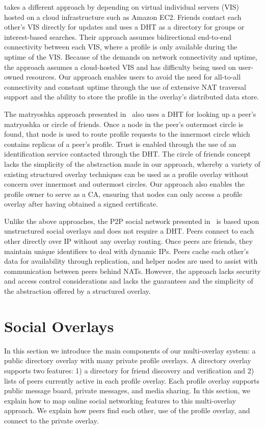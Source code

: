 \documentclass[letterpaper,twocolumn,10pt]{article}
\begin{document}
\cite{vis-a-vis} takes a different approach by depending on virtual individual
servers (VIS) hosted on a cloud infrastructure such as Amazon EC2. Friends
contact each other's VIS directly for updates and uses a DHT as a directory for
groups or interest-based searches. Their approach assumes bidirectional
end-to-end connectivity between each VIS, where a profile is only available
during the uptime of the VIS.  Because of the demands on network connectivity
and uptime, the approach assumes a cloud-hosted VIS and has difficulty being used on user-owned resources.
Our approach enables users to avoid the need for all-to-all connectivity and
constant uptime through the use of extensive NAT traversal support and the
ability to store the profile in the overlay's distributed data store.

The matryoshka approach presented in~\cite{matryoshka} also uses a DHT for
looking up a peer's matryoshka or circle of friends. Once a node in the peer's
outermost circle is found, that node is used to route profile requests to the
innermost circle which contains replicas of a peer's profile. Trust is enabled
through the use of an identification service contacted through the DHT.  The
circle of friends concept lacks the simplicity of the abstraction made in our
approach, whereby a variety of existing structured overlay techniques can be used as a profile
overlay without concern over innermost and outermost circles.  Our approach
also enables the profile owner to serve as a CA, ensuring that nodes can only
access a profile overlay after having obtained a signed certificate.

Unlike the above approaches, the P2P social network presented in~\cite{tribler-osn}
is based upon unstructured social overlays and does not require a DHT.  Peers
connect to each other directly over IP without any overlay routing. Once peers
are friends, they maintain unique identifiers to deal with dynamic IPs.  Peers
cache each other's data for availability through replication, and helper nodes
are used to assist with communication between peers behind NATs.  However, the
approach lacks security and access control considerations and lacks the
guarantees and the simplicity of the abstraction offered by a structured overlay.

\section{Social Overlays}
\label{social_overlays}
In this section we introduce the main components of our multi-overlay system:
a public directory overlay with many private profile overlays.  A directory
overlay supports two features:  1) a directory for friend discovery and
verification and 2) lists of peers currently active in each profile overlay.
Each profile overlay supports public message board, private messages, and
media sharing.  In this section, we explain how to map online social networking
features to this multi-overlay approach.  We explain how peers find each other,
use of the profile overlay, and connect to the private overlay.
\end{document}
